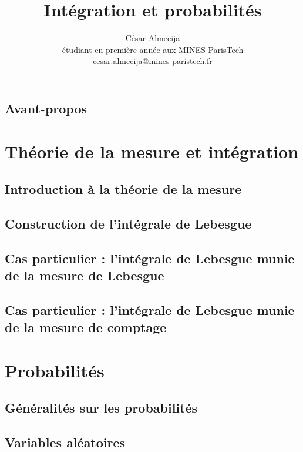 \documentclass[french]{report}
\theoremstyle{plain}
\theoremstyle{definition}
\theoremstyle{remark}
\begin{document}
\title{Intégration et probabilités}

\author{César Almecija
\\ étudiant en première année aux MINES ParisTech
\\ \href{mailto:cesar.almecija@mines-paristech.fr}{cesar.almecija@mines-paristech.fr}}

\maketitle

\tableofcontents

\chapter*{Avant-propos}



\part{Théorie de la mesure et intégration}

\chapter{Introduction à la théorie de la mesure}



\chapter{Construction de l'intégrale de Lebesgue}



\chapter{Cas particulier : l'intégrale de Lebesgue munie de la mesure de Lebesgue}



\chapter{Cas particulier : l'intégrale de Lebesgue munie de la mesure de comptage}



\part{Probabilités}

\chapter{Généralités sur les probabilités}



\chapter{Variables aléatoires}


\end{document}
